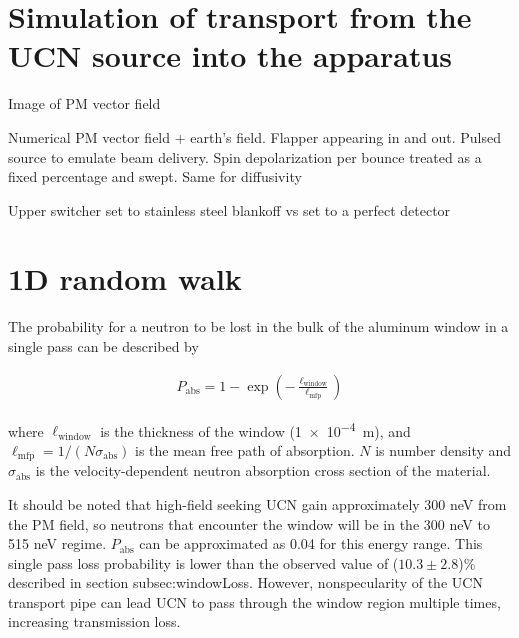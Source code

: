 
\section{Simulation of transport from the UCN source into the apparatus}\label{sec:switcher_wye_transport_monte_carlo}


Image of PM vector field

Numerical PM vector field + earth's field. Flapper appearing in and out. Pulsed source to emulate beam delivery. Spin depolarization per bounce treated as a fixed percentage and swept. Same for diffusivity

Upper switcher set to stainless steel blankoff vs set to a perfect detector



\section{1D random walk}\label{sec:1D_random_walk}


The probability for a neutron to be lost in the bulk of the aluminum window in a single pass can be described by

\begin{gather}
   P_\text{abs} = 1 - \exp \left( - \frac{\ell_\text{window} }{ \ell_\text{mfp} } \right)
\end{gather}

where $\ell_\text{window}$ is the thickness of the window (\qty{1e-4}{m}), and $\ell_\text{mfp} = 1 / (N\sigma_\text{abs})$ is the mean free path of absorption. $N$ is number density and $\sigma_\text{abs}$ is the velocity-dependent neutron absorption cross section of the material. 

It should be noted that high-field seeking UCN gain approximately 300 neV from the PM field, so neutrons that encounter the window will be in the 300 neV to 515 neV regime. $P_\text{abs}$ can be approximated as 0.04 for this energy range. This single pass loss probability is lower than the observed value of ($10.3\pm 2.8$)\% described in section subsec:windowLoss. However, nonspecularity of the UCN transport pipe can lead UCN to pass through the window region multiple times, increasing transmission loss. 

